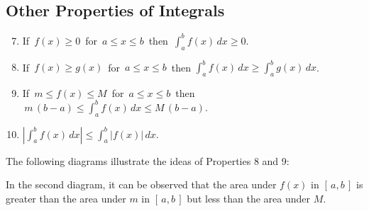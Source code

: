 \newpage

\subsection*{Other Properties of Integrals}
\begin{boxnote}
\begin{enumerate}
\setcounter{enumi}{6}
\item If $\,f(x)\geq 0\,$ for $\,a\leq x \leq b\,$ then $\,\displaystyle \int_a^bf(x)\,dx\geq 0$. \\[2ex]
\item If $\,f(x)\geq g(x)\,$ for $\,a\leq x \leq b\,$ then $\displaystyle \int_a^bf(x)\,dx\geq \int_a^bg(x)\,dx$. \\[2ex]
\item If $\,m\leq f(x)\leq M\,$ for $\,a\leq x \leq b\,$ then $\displaystyle \,m\,(b-a)\leq \int_a^bf(x)\,dx\leq M\,(b-a)$. \\[2ex]
\item $\displaystyle \left|\int_a^bf(x)\,dx\right| \leq \int_a^b|f(x)|\,dx$.
\end{enumerate}
\end{boxnote}

\newpage

 The following diagrams illustrate the ideas of Properties
8 and 9:


In the second diagram, it can be observed that the area under $f(x)$
in $[\,a,b\,]$ is greater than the area under $m$ in $[\,a,b\,]$ but
less than the area under $M$.



